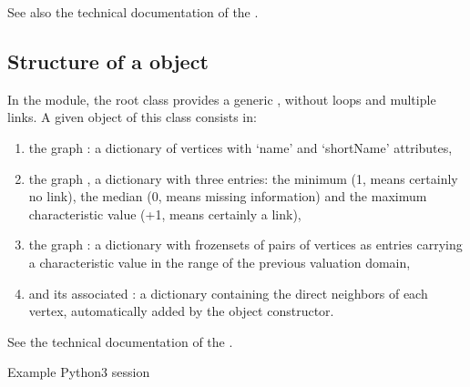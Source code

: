 \documentclass[a4paper,12pt,english]{sphinxhowto}
\begin{document}
See also the technical documentation of the .


\subsection{Structure of a  object}
\label{\detokenize{tutorial:structure-of-a-graph-object}}
In the  module, the root  class provides a generic , without loops and multiple links. A given object of this class consists in:
\begin{enumerate}
%
\item {} 
the graph  : a dictionary of vertices with ‘name’ and ‘shortName’ attributes,

\item {} 
the graph  , a dictionary with three entries: the minimum (\sphinxhyphen{}1, means certainly no link), the median (0, means missing information) and the maximum characteristic value (+1, means certainly a link),

\item {} 
the graph  : a dictionary with frozensets of pairs of vertices as entries carrying a characteristic value in the range of the previous valuation domain,

\item {} 
and its associated  : a dictionary containing the direct neighbors of each vertex, automatically added by the object constructor.

\end{enumerate}

See the technical documentation of the .

Example Python3 session

\begin{sphinxVerbatim}[commandchars=\\\{\},numbers=left,firstnumber=1,stepnumber=1]
   
  
\end{sphinxVerbatim}
\end{document}
